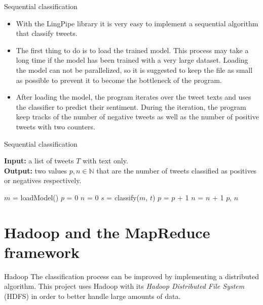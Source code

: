 \documentclass{beamer}
\begin{document}
\begin{frame}{Sequential classification}

\begin{itemize}
\item
With the LingPipe library it is very easy to implement a sequential algorithm that classify tweets.
\item
The first thing to do is to load the trained model. This process may take a long time if the model has been trained with a very large dataset. Loading the model can not be parallelized, so it is suggested to keep the file as small as possible to prevent it to become the bottleneck of the program.
\item
After loading the model, the program iterates over the tweet texts and uses the classifier to predict their sentiment. During the iteration, the program keep tracks of the number of negative tweets as well as the number of positive tweets with two counters.
\end{itemize}

\end{frame}


\begin{frame}[fragile]{Sequential classification}

\begin{algorithm}[H]
\caption{Sequential classification}
\footnotesize
\textbf{Input:} a list of tweets $T$ with text only. \\
\textbf{Output:} two values $p, n \in \mathbb{N}$ that are the number of tweets classified as positives or negatives respectively. \\
\begin{algorithmic}

\State $m$ = loadModel()
\State $p$ = 0
\State $n$ = 0
    \State $s$ = classify($m$, $t$)
        \State $p$ = $p$ + 1
    \Else
        \State $n$ = $n$ + 1
    \EndIf
\EndFor
\State \Return $p$, $n$

\end{algorithmic}
\end{algorithm}

\end{frame}


\section{Hadoop and the MapReduce framework}


\begin{frame}{Hadoop}
The classification process can be improved by implementing a distributed algorithm. This project uses Hadoop with its \textit{Hadoop Distributed File System} (HDFS) in order to better handle large amounts of data.
\end{frame}
\end{document}

